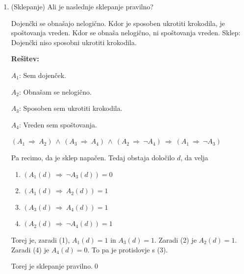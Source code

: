 \documentclass[11pt,paper=b5,footinclude,headinclude]{scrbook} %
\def\ali {{~\vee~}}
\def\inn {{~\wedge~}}
\def\sledi {{~\Rightarrow~}}
\begin{document}
\begin{enumerate}
\bigskip

\item (Sklepanje)
Ali je naslednje sklepanje pravilno?

Dojenčki se obnašajo nelogično. Kdor je sposoben ukrotiti krokodila, je spoštovanja vreden.
Kdor se obnaša nelogično, ni spoštovanja vreden. Sklep: Dojenčki niso sposobni ukrotiti krokodila.


\textbf{Rešitev:}

$A_1$: Sem dojenček.

$A_2$: Obnašam se nelogično.

$A_3$: Sposoben sem ukrotiti krokodila.

$A_4$: Vreden sem spoštovanja.

$(A_1\sledi A_2)\inn (A_3\sledi A_4) \inn (A_2\sledi \neg A_4)\sledi (A_1\sledi \neg A_3)$

Pa recimo, da je sklep napačen. Tedaj obstaja določilo $d$, da velja
\begin{enumerate}[(1)]
  \item $(A_1(d)\sledi \neg A_3(d)) = 0$
  \item $(A_1(d)\sledi A_2(d)) = 1$
  \item $(A_3(d)\sledi A_4(d)) = 1$
  \item $(A_2(d)\sledi \neg A_4(d)) = 1$
\end{enumerate}
Torej je, zaradi (1), $A_1(d) = 1$ in $A_3(d) = 1$. Zaradi (2) je $A_2(d) = 1$.
Zaradi (4) je $A_4(d) = 0$. To pa je protislovje s (3).

Torej je sklepanje pravilno.\qed


%
%
%
%
%
%
%
%
%
%
%
%
%
%
%
%
%
%
%
%
%
%
%
%
%
%
%



\end{enumerate}
\end{document}
